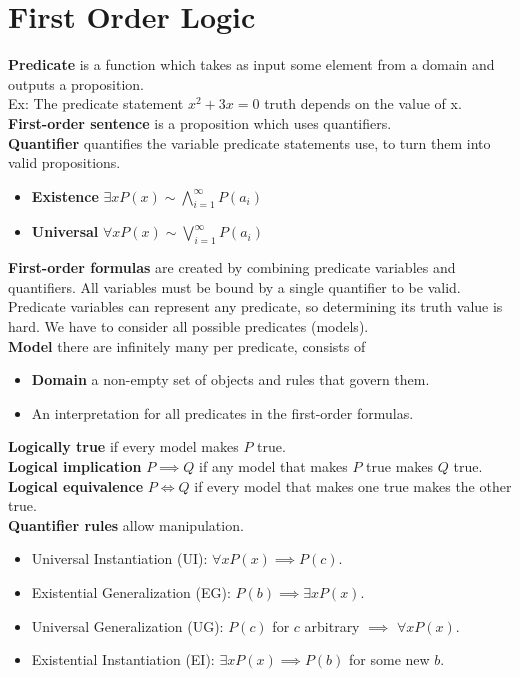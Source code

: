\documentclass[12pt, letterpaper]{article}
\begin{document}
\section{First Order Logic}
\textbf{Predicate} is a function which takes as input
some element from a domain and outputs a proposition.
\\Ex: The predicate statement $x^2+3x=0$ truth depends on the value of x.
\\\textbf{First-order sentence} is a proposition which uses quantifiers.
\\\textbf{Quantifier} quantifies the variable predicate statements use, to turn them into valid propositions.
\begin{itemize}
  \item \textbf{Existence} $\exists xP(x)\sim\bigwedge_{i=1}^{\infty}P(a_i)$
  \item \textbf{Universal} $\forall xP(x)\sim\bigvee_{i=1}^{\infty}P(a_i)$ 
\end{itemize}
\textbf{First-order formulas} are created by combining 
predicate variables and quantifiers. All variables must be bound by a single quantifier to be valid.
\\Predicate variables can represent any predicate, so determining
its truth value is hard. We have to consider all possible predicates (models).
\\\textbf{Model} there are infinitely many per predicate, consists of
\begin{itemize}
  \item \textbf{Domain} a non-empty set of objects and rules that govern them.
  \item An interpretation for all predicates in the first-order formulas.
\end{itemize}
\textbf{Logically true} if every model makes $P$ true.
\\\textbf{Logical implication} $P\implies Q$ if any model that makes $P$ true makes $Q$ true.
\\\textbf{Logical equivalence} $P\iff Q$ if every model that makes one true makes the other true.
\\\textbf{Quantifier rules} allow manipulation.
\begin{itemize}
  \item Universal Instantiation (UI): $\forall xP(x)\implies P(c)$.
  \item Existential Generalization (EG): $P(b)\implies\exists xP(x)$.
  \item Universal Generalization (UG): $P(c)$ for $c$ arbitrary $\implies$ $\forall xP(x)$.
  \item Existential Instantiation (EI): $\exists xP(x)\implies P(b)$ for some new $b$.
\end{itemize}
\end{document}
